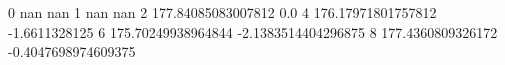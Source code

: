 0 nan nan
1 nan nan
2 177.84085083007812 0.0
4 176.17971801757812 -1.6611328125
6 175.70249938964844 -2.1383514404296875
8 177.4360809326172 -0.4047698974609375
